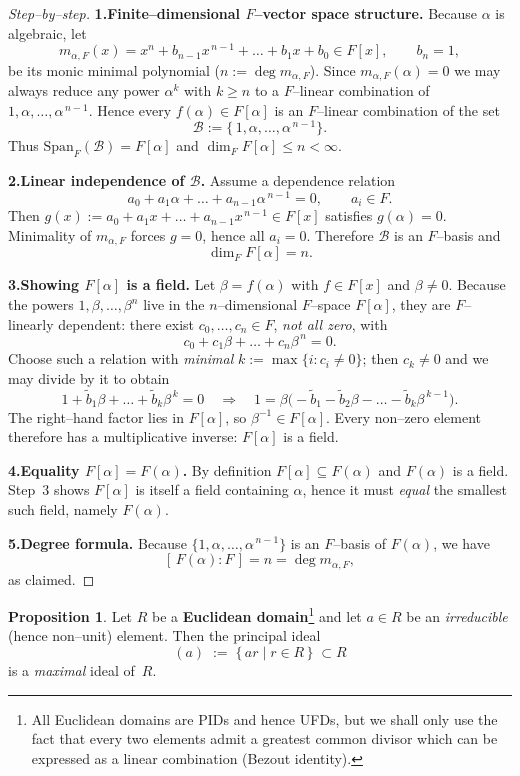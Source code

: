 \documentclass[12pt]{article}
\theoremstyle{definition} %
\newtheorem{proposition}{Proposition}
\theoremstyle{plain} %
\begin{document}
  \begin{proof}[Step--by--step]
  \textbf{1.\;Finite--dimensional $F$–vector space structure.}
  Because $\alpha$ is algebraic, let
  \[
       m_{\alpha,F}(x)=x^{n}+b_{n-1}x^{\,n-1}+\dots+b_{1}x+b_{0}\in F[x],
       \qquad b_{n}=1,
  \]
  be its monic minimal polynomial ($n:=\deg m_{\alpha,F}$).  
  Since $m_{\alpha,F}(\alpha)=0$ we may always reduce any power
  $\alpha^{k}$ with $k\ge n$ to a $F$–linear combination of
  $1,\alpha,\dots,\alpha^{\,n-1}$.  
  Hence every $f(\alpha)\in F[\alpha]$ is an $F$–linear combination of the
  set
  \[
       \mathcal{B}:=\{\,1,\alpha,\dots,\alpha^{\,n-1}\}.
  \]
  Thus $\mathrm{Span}_{F}(\mathcal{B})=F[\alpha]$ and
  $\dim_{F}F[\alpha]\le n<\infty$.
  
  \medskip
  \textbf{2.\;Linear independence of $\mathcal{B}$.}
  Assume a dependence relation
  \[
       a_{0}+a_{1}\alpha+\dots+a_{n-1}\alpha^{\,n-1}=0,
       \qquad a_{i}\in F.
  \]
  Then $g(x):=a_{0}+a_{1}x+\dots+a_{n-1}x^{\,n-1}\in F[x]$
  satisfies $g(\alpha)=0$.
  Minimality of $m_{\alpha,F}$ forces $g=0$, hence all $a_{i}=0$.
  Therefore $\mathcal{B}$ is an $F$–basis and
  \[
       \dim_{F}F[\alpha]=n.
  \]
  
  \medskip
  \textbf{3.\;Showing $F[\alpha]$ is a field.}
  Let $\beta=f(\alpha)$ with $f\in F[x]$ and $\beta\neq0$.
  Because the powers $1,\beta,\dots,\beta^{n}$ live in the
  $n$–dimensional $F$–space $F[\alpha]$, they are $F$–linearly dependent:
  there exist $c_{0},\dots,c_{n}\in F$, \emph{not all zero}, with
  \[
       c_{0}+c_{1}\beta+\dots+c_{n}\beta^{\,n}=0.
  \]
  Choose such a relation with \emph{minimal} $k:=\max\{i:c_{i}\neq0\}$; then $c_{k}\neq0$ and we may divide
  by it to obtain
  \[
       1+\tilde b_{1}\beta+\dots+\tilde b_{k}\beta^{\,k}=0
       \quad\Longrightarrow\quad
       1=\beta\bigl(-\tilde b_{1}-\tilde b_{2}\beta-\dots-\tilde b_{k}\beta^{\,k-1}\bigr).
  \]
  The right--hand factor lies in $F[\alpha]$, so $\beta^{-1}\in F[\alpha]$.
  Every non–zero element therefore has a multiplicative inverse:
  $F[\alpha]$ is a field.
  
  \medskip
  \textbf{4.\;Equality $F[\alpha]=F(\alpha)$.}
  By definition $F[\alpha]\subseteq F(\alpha)$ and $F(\alpha)$ is a field.
  Step~3 shows $F[\alpha]$ is itself a field containing $\alpha$,
  hence it must \emph{equal} the smallest such field, namely $F(\alpha)$.
  
  \medskip
  \textbf{5.\;Degree formula.}
  Because $\{1,\alpha,\dots,\alpha^{\,n-1}\}$ is an $F$–basis of
  $F(\alpha)$, we have
  \[
       [\,F(\alpha):F\,]=n=\deg m_{\alpha,F},
  \]
  as claimed.
  \end{proof}\begin{proposition}
    Let $R$ be a \textbf{Euclidean domain}\footnote{%
    All Euclidean domains are PIDs and hence UFDs, but we shall only
    use the fact that every two elements admit a greatest common divisor
    which can be expressed as a linear combination (Bezout identity).}
    and let $a\in R$ be an \emph{irreducible} (hence non–unit) element.
    Then the principal ideal
    \[
       (a)\;:=\;\{\,ar \mid r\in R\,\}\;\subset R
    \]
    is a \emph{maximal} ideal of~$R$.
    \end{proposition}
    
\end{document}
